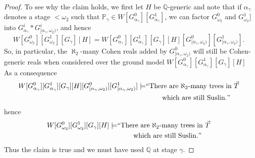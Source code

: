 \documentclass[a4paper,12pt]{article}
\newcommand{\forceP}{\mathbb{P}}
\newcommand{\forceQ}{\mathbb{Q}}
\begin{document}
\begin{proof}
To see why the claim holds, we first let $H$ be $\forceQ$-generic and note that if $\alpha_{\gamma}$ denotes a stage $<\omega_2$ such that $\forceP_{\gamma} \in W[G^0_{\alpha_{\gamma}}] [G^1_{\alpha_{\gamma}}]$, we can factor $G^0_{\omega_2}$ and $G^1_{\omega_2}]$ into $G^i_{\alpha_{\gamma}} \ast G^i_{[\alpha_{\gamma},\omega_2)}$, and hence
\[ W[G^0_{\omega_2}][G^1_{\omega_2}][G_{\gamma}] [H] = W[G^0_{\alpha_{\gamma}}] [G^1_{\alpha_{\gamma}}] [G_{\gamma}][H] [G^0_{[\alpha_{\gamma},\omega_2)} ] [G^1_{[\alpha_{\gamma},\omega_2)} ]. \]
So, in particular, the $\aleph_2$-many Cohen reals added by $G^0_{[\alpha_{\gamma}, \omega_2)}$ will still be Cohen-generic reals when considered over the ground model
$W[G^0_{\alpha_{\gamma}}] [G^1_{\alpha_{\gamma}}] [G_{\gamma}][H]$
As a consequence 
\begin{align*}
W[G^0_{\alpha_{\gamma}}] [G^1_{\alpha_{\gamma}}] [G_{\gamma}] [H] [G^0_{[\alpha_{\gamma},\omega_2)} ] [G^1_{[\alpha_{\gamma},\omega_2)} ] \models &``\text{There are $\aleph_2$-many trees in $\vec{T}$} \\&  \qquad\text{ which are still Suslin.} "
\end{align*}
hence
\begin{align*}
 W[G^0_{\omega_2}][G^1_{\omega_2}][G_{\gamma}] [H] \models &``\text{There are $\aleph_2$-many trees in $\vec{T}$} \\&  \qquad\text{ which are still Suslin.} "
\end{align*}
Thus the claim is true and we must have used $\forceQ$ at stage $\gamma$.

\end{proof}
\end{document}
